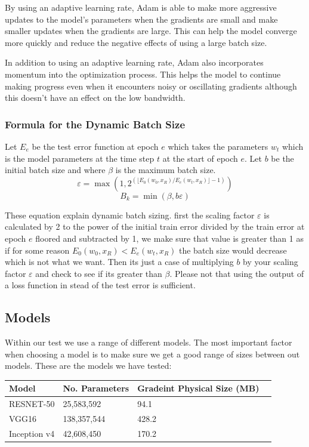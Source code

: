 \documentclass[11pt]{article}
\begin{document}
By using an adaptive learning rate, Adam is able to make more aggressive updates to the model's parameters when the gradients are small and make smaller updates when the gradients are large. This can help the model converge more quickly and reduce the negative effects of using a large batch size.
 
In addition to using an adaptive learning rate, Adam also incorporates momentum into the optimization process. This helps the model to continue making progress even when it encounters noisy or oscillating gradients although this doesn't have an effect on the low bandwidth.



\subsubsection{Formula for the Dynamic Batch Size}

Let $E_e$ be the test error function at epoch $e$ which takes the parameters $w_t$ which is the model parameters at the time step $t$ at the start of epoch $e$. Let $b$ be the initial batch size and where      $\beta$ is the maximum batch size.  
\newpage
\begingroup
\Large
$$
\varepsilon = \max \left(1, 2^{(\lfloor E_0(w_0,x_R)/E_e(w_t, x_R) \rfloor -1)} \right)
$$
$$
B_k = \min \left(\beta,b\varepsilon\right)
$$
\endgroup

These equation explain dynamic batch sizing. first the scaling factor $\varepsilon$ is calculated by 2 to the power of the initial train error divided by the train error at epoch $e$ floored and subtracted by 1, we make sure that value is greater than 1 as if for some reason $E_0(w_0,x_R) < E_e(w_t, x_R)$ the batch size would decrease which is not what we want. Then its just a case of multiplying $b$ by your scaling factor    $\varepsilon$ and check to see if its greater than $\beta$. Please not that using the output of a loss function in stead of the test error is sufficient.


\subsection{Models}
Within our test we use a range of different models. The most important factor when choosing a model is to make sure we get a good range of sizes between out models. These are the models we have tested:

\begin{center}
\begin{tabular}{| p{3cm} | p{3cm} | p{3cm} | p{3cm} |} 
\hline
Model & No. Parameters &  Gradeint Physical Size (MB)\\ \hline
RESNET-50 & 25,583,592 &  94.1 \\ \hline
VGG16 &  138,357,544 &  428.2 \\ \hline
Inception v4 & 42,608,450 &  170.2\\ \hline
\end{tabular}
\end{center}
\end{document}
